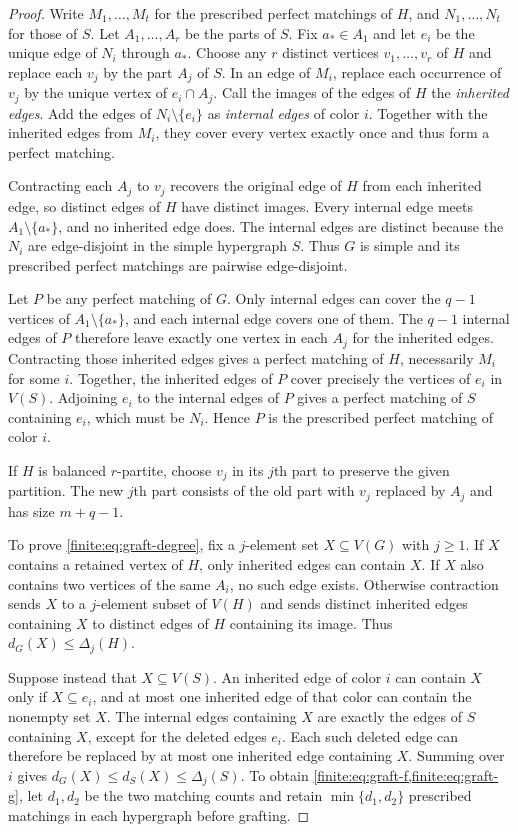 \documentclass[10pt]{article}
\numberwithin{equation}{section}
\begin{document}
\begin{proof}
Write $M_1,\ldots,M_t$ for the prescribed perfect matchings of $H$, and $N_1,\ldots,N_t$ for those of $S$. Let $A_1,\ldots,A_r$ be the parts of $S$. Fix $a_*\in A_1$ and let $e_i$ be the unique edge of $N_i$ through $a_*$. Choose any $r$ distinct vertices $v_1,\ldots,v_r$ of $H$ and replace each $v_j$ by the part $A_j$ of $S$. In an edge of $M_i$, replace each occurrence of $v_j$ by the unique vertex of $e_i\cap A_j$. Call the images of the edges of $H$ the \emph{inherited edges}. Add the edges of $N_i\setminus\{e_i\}$ as \emph{internal edges} of color $i$. Together with the inherited edges from $M_i$, they cover every vertex exactly once and thus form a perfect matching.

Contracting each $A_j$ to $v_j$ recovers the original edge of $H$ from each inherited edge, so distinct edges of $H$ have distinct images. Every internal edge meets $A_1\setminus\{a_*\}$, and no inherited edge does. The internal edges are distinct because the $N_i$ are edge-disjoint in the simple hypergraph $S$. Thus $G$ is simple and its prescribed perfect matchings are pairwise edge-disjoint.

Let $P$ be any perfect matching of $G$. Only internal edges can cover the $q-1$ vertices of $A_1\setminus\{a_*\}$, and each internal edge covers one of them. The $q-1$ internal edges of $P$ therefore leave exactly one vertex in each $A_j$ for the inherited edges. Contracting those inherited edges gives a perfect matching of $H$, necessarily $M_i$ for some $i$. Together, the inherited edges of $P$ cover precisely the vertices of $e_i$ in $V(S)$. Adjoining $e_i$ to the internal edges of $P$ gives a perfect matching of $S$ containing $e_i$, which must be $N_i$. Hence $P$ is the prescribed perfect matching of color $i$.

If $H$ is balanced $r$-partite, choose $v_j$ in its $j$th part to preserve the given partition. The new $j$th part consists of the old part with $v_j$ replaced by $A_j$ and has size $m+q-1$.

To prove \cref{finite:eq:graft-degree}, fix a $j$-element set $X\subseteq V(G)$ with $j\ge1$. If $X$ contains a retained vertex of $H$, only inherited edges can contain $X$. If $X$ also contains two vertices of the same $A_i$, no such edge exists. Otherwise contraction sends $X$ to a $j$-element subset of $V(H)$ and sends distinct inherited edges containing $X$ to distinct edges of $H$ containing its image. Thus $d_G(X)\le\Delta_j(H)$.

Suppose instead that $X\subseteq V(S)$. An inherited edge of color $i$ can contain $X$ only if $X\subseteq e_i$, and at most one inherited edge of that color can contain the nonempty set $X$. The internal edges containing $X$ are exactly the edges of $S$ containing $X$, except for the deleted edges $e_i$. Each such deleted edge can therefore be replaced by at most one inherited edge containing $X$. Summing over $i$ gives $d_G(X)\le d_S(X)\le\Delta_j(S)$. To obtain \cref{finite:eq:graft-f,finite:eq:graft-g}, let $d_1,d_2$ be the two matching counts and retain $\min\{d_1,d_2\}$ prescribed matchings in each hypergraph before grafting.
\end{proof}
\end{document}
